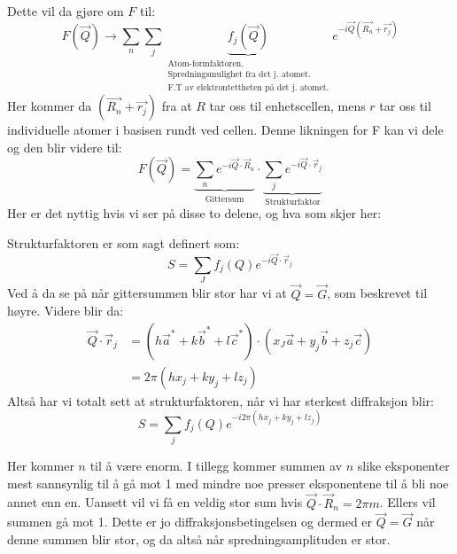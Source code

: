 \documentclass{article}
\begin{document}
Dette vil da gjøre om $F$ til:
\begin{equation*}
    F(\vec{Q}) \rightarrow \sum_n \sum_j\underbrace{f_j(\vec{Q})}_{\substack{\text{Atom-formfaktoren.} \\ \text{Spredningsmulighet fra det j. atomet.} \\ \text{F.T av elektrontettheten på det j. atomet.}}} e^{-i\vec{Q}(\vec{R_n} + \vec{r_j})}
\end{equation*}
Her kommer da $(\vec{R_n} + \vec{r_j})$ fra at $R$ tar oss til enhetscellen, mens $r$ tar oss til individuelle atomer i basisen rundt ved cellen. Denne likningen for F kan vi dele og den blir videre til:
\begin{equation*}
    F(\vec{Q}) = \underbrace{\sum_n e^{-i \vec{Q} \cdot \vec{R}_n} }_{\text{Gittersum}}\cdot \underbrace{\sum_j e^{-i \vec{Q} \cdot \vec{r}_j}}_{\text{Strukturfaktor}}
\end{equation*}
Her er det nyttig hvis vi ser på disse to delene, og hva som skjer her:

\begin{minipage}{0.45\textwidth}
Strukturfaktoren er som sagt definert som: \begin{equation*}
    S = \sum_J f_j (Q) e^{-i \vec{Q} \cdot \vec{r}_j}
\end{equation*}
Ved å da se på når gittersummen blir stor har vi at $\vec{Q} = \vec{G}$, som beskrevet til høyre. Videre blir da:
\begin{align*}
    \vec{Q} \cdot \vec{r}_j &= (h \vec{a}^{*} + k \vec{b}^{*} + l \vec{c}^{*}) \cdot(x_J \vec{a} + y_j \vec{b} + z_j \vec{c}) \\
    &= 2 \pi (h x_j + ky_j + lz_j)
\end{align*}
Altså har vi totalt sett at strukturfaktoren, når vi har sterkest diffraksjon blir:
\begin{equation}
\label{eq:strukturfaktoren}
    \boxed{S = \sum_j f_j(Q) e^{-i 2 \pi (h x_j + ky_j + lz_j)}}
\end{equation}
\end{minipage}
\hfill
\begin{minipage}{0.45\textwidth}
Her kommer $n$ til å være enorm. I tillegg kommer summen av $n$ slike eksponenter mest sannsynlig til å gå mot 1 med mindre noe presser eksponentene til å bli noe annet enn en. Uansett vil vi få en veldig stor sum hvis $\vec{Q} \cdot \vec{R}_n = 2 \pi m$. Ellers vil summen gå mot 1. Dette er jo diffraksjonsbetingelsen og dermed er $\vec{Q} = \vec{G}$ når denne summen blir stor, og da altså når spredningsamplituden er stor.
\end{minipage}
\end{document}
